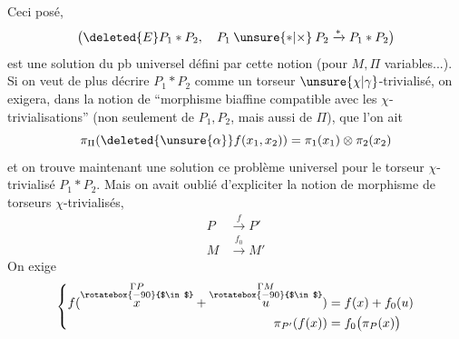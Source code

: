 Ceci posé,
\[
\bigl(\deleted{E}P_1*P_2,\quad P_1\mathbin{\unsure{*|\times}}P_2\xrightarrow{*}P_1*P_2\bigr)
\]
 est une solution du pb universel défini par cette notion (pour $M,\Pi$ variables...).
Si on veut de plus décrire $P_1*P_2$ comme un torseur $\unsure{\chi|\gamma}$-trivialisé, on  exigera, dans la notion de ``morphisme biaffine compatible avec les $\chi$-trivialisations'' (non seulement de $P_1,P_2$, mais aussi de $\Pi$), que l'on ait
\[
\pi_{\Pi}(\deleted{\unsure{\alpha}}f(x_1,x_2))=\pi_1(x_1)\otimes\pi_2(x_2)
\]
et on trouve maintenant une solution  ce problème universel pour le torseur $\chi$-trivialisé $P_1*P_2$.
Mais on avait oublié d'expliciter la notion de morphisme de torseurs $\chi$-trivialisés,
\[
\begin{aligned}
P&\xrightarrow{f}P'\\
M&\xrightarrow{f_0}M'
\end{aligned}
\]
On exige
\[
\left\{\begin{aligned}
f(\overset{\substack{\Gamma P\\\rotatebox{-90}{$\in$}}}{x}+\overset{\substack{\Gamma M\\\rotatebox{-90}{$\in$}}}{u})&=f(x)+f_0(u)\\
\pi_{P'}(f(x))&=f_0\bigl(\pi_P(x)\bigr)
\end{aligned}\right.
\]
